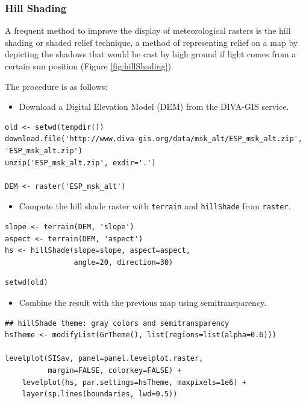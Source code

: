 \documentclass[smallroyalvopaper]{memoir}
\begin{document}
\subsubsection{Hill Shading}
\label{sec-1-1-1}
A frequent method to improve the display of meteorological rasters is
the hill shading or shaded relief technique, a method of representing
relief on a map by depicting the shadows that would be cast by high
ground if light comes from a certain sun position (Figure
\ref{fig:hillShading}).

The procedure is as follows:

\begin{itemize}
\item Download a Digital Elevation Model (DEM) from the DIVA-GIS service.
\end{itemize}

\lstset{language=R,numbers=none}
\begin{lstlisting}
old <- setwd(tempdir())
download.file('http://www.diva-gis.org/data/msk_alt/ESP_msk_alt.zip', 'ESP_msk_alt.zip')
unzip('ESP_msk_alt.zip', exdir='.')

DEM <- raster('ESP_msk_alt')
\end{lstlisting}

\begin{itemize}
\item Compute the hill shade raster with \texttt{terrain} and \texttt{hillShade} from \texttt{raster}.
\end{itemize}

\lstset{language=R,numbers=none}
\begin{lstlisting}
slope <- terrain(DEM, 'slope')
aspect <- terrain(DEM, 'aspect')
hs <- hillShade(slope=slope, aspect=aspect,
                angle=20, direction=30)
\end{lstlisting}
\lstset{language=R,numbers=none}
\begin{lstlisting}
setwd(old)
\end{lstlisting}

\begin{itemize}
\item Combine the result with the previous map using semitransparency.
\end{itemize}

\lstset{language=R,numbers=none}
\begin{lstlisting}
## hillShade theme: gray colors and semitransparency
hsTheme <- modifyList(GrTheme(), list(regions=list(alpha=0.6)))

levelplot(SISav, panel=panel.levelplot.raster,
          margin=FALSE, colorkey=FALSE) +
    levelplot(hs, par.settings=hsTheme, maxpixels=1e6) +
    layer(sp.lines(boundaries, lwd=0.5))
\end{lstlisting}
\end{document}
